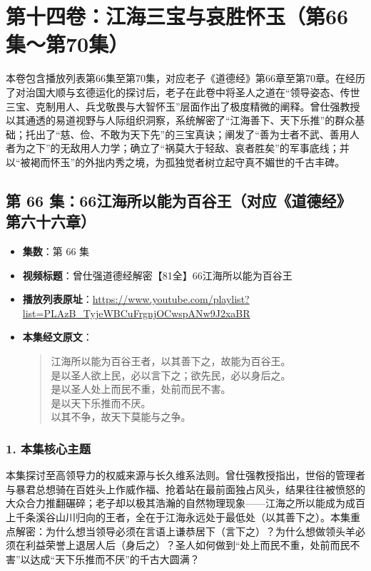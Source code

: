 \section*{第十四卷：江海三宝与哀胜怀玉（第66集～第70集）}

本卷包含播放列表第66集至第70集，对应老子《道德经》第66章至第70章。在经历了对治国大顺与玄德运化的探讨后，老子在此卷中将圣人之道在“领导姿态、传世三宝、克制用人、兵戈敬畏与大智怀玉”层面作出了极度精微的阐释。曾仕强教授以其通透的易道视野与人际组织洞察，系统解密了“江海善下、天下乐推”的群众基础；托出了“慈、俭、不敢为天下先”的三宝真诀；阐发了“善为士者不武、善用人者为之下”的无敌用人力学；确立了“祸莫大于轻敌、哀者胜矣”的军事底线；并以“被褐而怀玉”的外拙内秀之境，为孤独觉者树立起守真不媚世的千古丰碑。

\clearpage

\subsection{第 66 集：66江海所以能为百谷王（对应《道德经》第六十六章）}
\label{sec:ep66}

\begin{itemize}
    \item \textbf{集数}：第 66 集
    \item \textbf{视频标题}：曾仕强道德经解密【81全】66江海所以能为百谷王
    \item \textbf{播放列表原址}：\url{https://www.youtube.com/playlist?list=PLAzB_TyjeWBCuFrgnjOCwspANw9J2xaBR}
    \item \textbf{本集经文原文}：
    \begin{quote}\kaishu
    江海所以能为百谷王者，以其善下之，故能为百谷王。\\
    是以圣人欲上民，必以言下之；欲先民，必以身后之。\\
    是以圣人处上而民不重，处前而民不害。\\
    是以天下乐推而不厌。\\
    以其不争，故天下莫能与之争。
    \end{quote}
\end{itemize}

\subsubsection{1. 本集核心主题}
本集探讨至高领导力的权威来源与长久维系法则。曾仕强教授指出，世俗的管理者与暴君总想骑在百姓头上作威作福、抢着站在最前面独占风头，结果往往被愤怒的大众合力推翻碾碎；老子却以极其浩瀚的自然物理现象——江海之所以能成为成百上千条溪谷山川归向的王者，全在于江海永远处于最低处（以其善下之）。本集重点解密：为什么想当领导必须在言语上谦恭居下（言下之）？为什么想做领头羊必须在利益荣誉上退居人后（身后之）？圣人如何做到“处上而民不重，处前而民不害”以达成“天下乐推而不厌”的千古大圆满？

